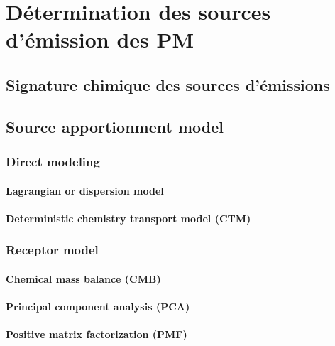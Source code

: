 \section{Détermination des sources d'émission des PM}%
\label{sec:source_apportionment_of_pm}

\subsection{Signature chimique des sources d'émissions}%
\label{sec:chemical_signature_of_the_sources}

\subsection{Source apportionment model}%
\label{sec:source_apportionment_model}

\subsubsection{Direct modeling}%
\label{sub:direct_modeling}

\paragraph{Lagrangian or dispersion model}%
\label{sub:lagrangian_or_dispersion_model}

\paragraph{Deterministic chemistry transport model (CTM)}%
\label{sub:deterministic_chemistry_transport_model_ctm_}

\subsubsection{Receptor model}%
\label{sec:receptor_model}

\paragraph{Chemical mass balance (CMB)}%
\label{sub:chemical_mass_balance_cmb_}

\paragraph{Principal component analysis (PCA)}%
\label{sub:principal_component_analysis_pca_}

\paragraph{Positive matrix factorization (PMF)}%
\label{sub:positive_matrix_factorization_pmf_}


